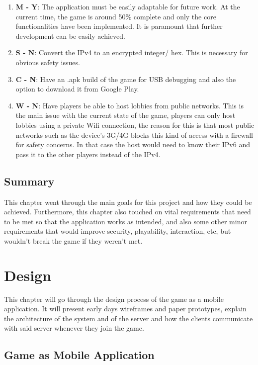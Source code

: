 \documentclass{dissertation}
\begin{document}
\begin{enumerate}
\item \textbf{M - Y}: The application must be easily adaptable for future work. At the current time, the game is around 50\% complete and only the core functionalities have been 
implemented. It is paramount that further development can be easily achieved.
\item \textbf{S - N}: Convert the IPv4 to an encrypted integer/ hex. This is necessary for obvious safety issues.
\item \textbf{C - N}: Have an .apk build of the game for USB debugging and also the option to download it from Google Play.
\item \textbf{W - N}: Have players be able to host lobbies from public networks. This is the main issue with the current state of the game, players can only host lobbies using a private Wifi connection, the reason for this is that most public networks such as the device's 3G/4G blocks this kind of access with a firewall for safety concerns. In that case the host would need to 
know their IPv6 and pass it to the other players instead of the IPv4.
\end{enumerate}

\section{Summary}
This chapter went through the main goals for this project and how they could be achieved. Furthermore, this chapter also touched on vital requirements that need to be met so that the 
application works as intended, and also some other minor requirements that would improve security, playability, interaction, etc, but wouldn't break the game if they weren't met.


\chapter{Design}

This chapter will go through the design process of the game as a mobile application. It will present early days wireframes and paper prototypes, explain the architecture of the system and of the server and how the clients communicate with said server whenever they join the game.

\section{Game as Mobile Application}
\end{document}
